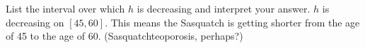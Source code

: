 {List the interval over which $h$ is decreasing and interpret your answer.}
{$h$ is decreasing on $[45,60]$.  This means the Sasquatch is getting shorter from the age of 45 to the age of 60. (Sasquatchteoporosis, perhaps?)}
